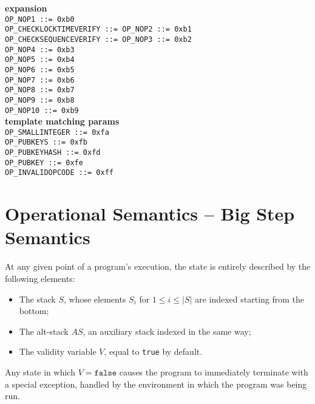 \documentclass{article}
\begin{document}
\begin{multicols}{3}
\textbf{\centering expansion} \\
\texttt{OP\_NOP1 ::= 0xb0  } \\
\texttt{OP\_CHECKLOCKTIMEVERIFY ::= OP\_NOP2 ::= 0xb1  } \\
\texttt{OP\_CHECKSEQUENCEVERIFY ::= OP\_NOP3 ::= 0xb2  } \\
\texttt{OP\_NOP4 ::= 0xb3  } \\
\texttt{OP\_NOP5 ::= 0xb4  } \\
\texttt{OP\_NOP6 ::= 0xb5  } \\
\texttt{OP\_NOP7 ::= 0xb6  } \\
\texttt{OP\_NOP8 ::= 0xb7  } \\
\texttt{OP\_NOP9 ::= 0xb8  } \\
\texttt{OP\_NOP10 ::= 0xb9  } \\

\textbf{\centering template matching params }\\
\texttt{OP\_SMALLINTEGER ::= 0xfa  } \\
\texttt{OP\_PUBKEYS ::= 0xfb  } \\
\texttt{OP\_PUBKEYHASH ::= 0xfd  } \\
\texttt{OP\_PUBKEY ::= 0xfe  } \\
\texttt{OP\_INVALIDOPCODE ::= 0xff  } \\

\end{multicols}

\pagebreak[2]

\hypertarget{OPSEM}{\section{Operational Semantics -- Big Step Semantics}}

At any given point of a program's execution, the state is entirely described by the following elements:

\begin{itemize}
    \item The stack $S$, whose elements $S_i$ for $1 \leq i \leq |S|$ are indexed starting from the bottom;
    \item The alt-stack $AS$, an auxiliary stack indexed in the same way;
    \item The validity variable $V$, equal to \texttt{true} by default.
\end{itemize}

Any state in which $V = \texttt{false}$ causes the program to immediately terminate with a special exception, handled by the environment in which the program was being run.
\end{document}
